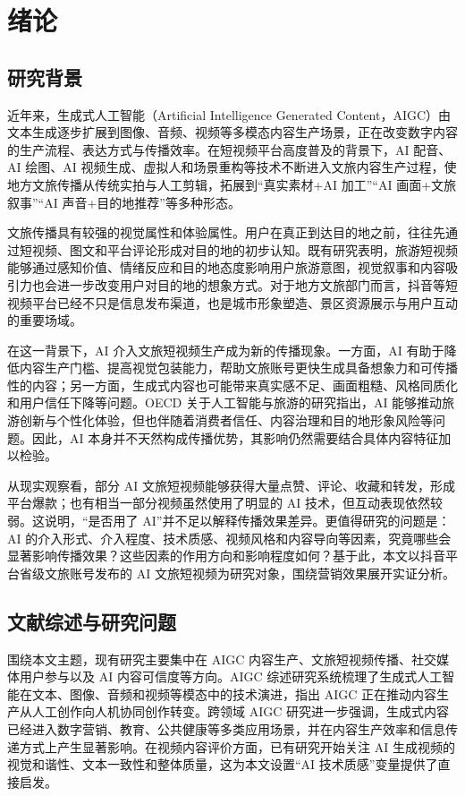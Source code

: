 \chapter{绪论}

\section{研究背景}

近年来，生成式人工智能（Artificial Intelligence Generated Content，AIGC）由文本生成逐步扩展到图像、音频、视频等多模态内容生产场景，正在改变数字内容的生产流程、表达方式与传播效率\cite{lit01}。在短视频平台高度普及的背景下，AI 配音、AI 绘图、AI 视频生成、虚拟人和场景重构等技术不断进入文旅内容生产过程，使地方文旅传播从传统实拍与人工剪辑，拓展到“真实素材+AI 加工”“AI 画面+文旅叙事”“AI 声音+目的地推荐”等多种形态。

文旅传播具有较强的视觉属性和体验属性。用户在真正到达目的地之前，往往先通过短视频、图文和平台评论形成对目的地的初步认知。既有研究表明，旅游短视频能够通过感知价值、情绪反应和目的地态度影响用户旅游意图\cite{lit04}，视觉叙事和内容吸引力也会进一步改变用户对目的地的想象方式\cite{lit06}。对于地方文旅部门而言，抖音等短视频平台已经不只是信息发布渠道，也是城市形象塑造、景区资源展示与用户互动的重要场域。

在这一背景下，AI 介入文旅短视频生产成为新的传播现象。一方面，AI 有助于降低内容生产门槛、提高视觉包装能力，帮助文旅账号更快生成具备想象力和可传播性的内容；另一方面，生成式内容也可能带来真实感不足、画面粗糙、风格同质化和用户信任下降等问题。OECD 关于人工智能与旅游的研究指出，AI 能够推动旅游创新与个性化体验，但也伴随着消费者信任、内容治理和目的地形象风险等问题\cite{lit23}。因此，AI 本身并不天然构成传播优势，其影响仍然需要结合具体内容特征加以检验。

从现实观察看，部分 AI 文旅短视频能够获得大量点赞、评论、收藏和转发，形成平台爆款；也有相当一部分视频虽然使用了明显的 AI 技术，但互动表现依然较弱。这说明，“是否用了 AI”并不足以解释传播效果差异。更值得研究的问题是：AI 的介入形式、介入程度、技术质感、视频风格和内容导向等因素，究竟哪些会显著影响传播效果？这些因素的作用方向和影响程度如何？基于此，本文以抖音平台省级文旅账号发布的 AI 文旅短视频为研究对象，围绕营销效果展开实证分析。

\section{文献综述与研究问题}

围绕本文主题，现有研究主要集中在 AIGC 内容生产、文旅短视频传播、社交媒体用户参与以及 AI 内容可信度等方向。AIGC 综述研究系统梳理了生成式人工智能在文本、图像、音频和视频等模态中的技术演进，指出 AIGC 正在推动内容生产从人工创作向人机协同创作转变\cite{lit01}。跨领域 AIGC 研究进一步强调，生成式内容已经进入数字营销、教育、公共健康等多类应用场景，并在内容生产效率和信息传递方式上产生显著影响\cite{lit26}。在视频内容评价方面，已有研究开始关注 AI 生成视频的视觉和谐性、文本一致性和整体质量，这为本文设置“AI 技术质感”变量提供了直接启发\cite{lit03}。

